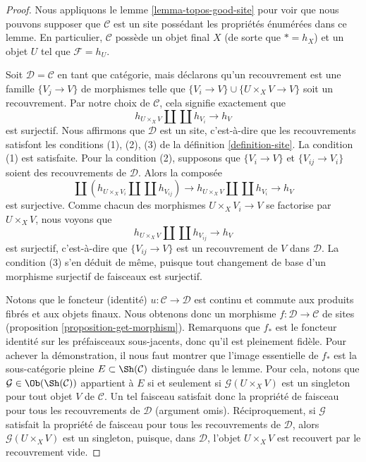 \begin{proof}
Nous appliquons le lemme \ref{lemma-topos-good-site} pour voir que nous pouvons supposer
que $\mathcal{C}$ est un site possédant les propriétés énumérées dans ce lemme.
En particulier, $\mathcal{C}$ possède un objet final $X$ (de sorte que
$* = h_X$) et un objet $U$ tel que $\mathcal{F} = h_U$.

\medskip\noindent
Soit $\mathcal{D} = \mathcal{C}$ en tant que catégorie, mais déclarons qu'un recouvrement
est une famille $\{V_j \to V\}$ de morphismes telle que
$\{V_i \to V\} \cup \{U \times_X V \to V\}$ soit un recouvrement.
Par notre choix de $\mathcal{C}$, cela signifie exactement que
$$
h_{U \times_X V} \amalg \coprod h_{V_i} \longrightarrow h_V
$$
est surjectif. Nous affirmons que $\mathcal{D}$ est un site, c'est-à-dire que les recouvrements
satisfont les conditions (1), (2), (3) de la définition \ref{definition-site}.
La condition (1) est satisfaite. Pour la condition (2), supposons que
$\{V_i \to V\}$ et $\{V_{ij} \to V_i\}$ soient des recouvrements de $\mathcal{D}$.
Alors la composée
$$
\coprod \left(
h_{U \times_X V_i} \amalg \coprod h_{V_{ij}}
\right) \longrightarrow
h_{U \times_X V} \amalg \coprod h_{V_i} \longrightarrow h_V
$$
est surjective. Comme chacun des morphismes $U \times_X V_i \to V$
se factorise par $U \times_X V$, nous voyons que
$$
h_{U \times_X V} \amalg \coprod h_{V_{ij}} \longrightarrow h_V
$$
est surjectif, c'est-à-dire que $\{V_{ij} \to V\}$ est un recouvrement de $V$ dans
$\mathcal{D}$. La condition (3) s'en déduit de même, puisque tout changement de base
d'un morphisme surjectif de faisceaux est surjectif.

\medskip\noindent
Notons que le foncteur (identité) $u : \mathcal{C} \to \mathcal{D}$ est
continu et commute aux produits fibrés et aux objets finaux. Nous obtenons donc
un morphisme $f : \mathcal{D} \to \mathcal{C}$ de sites
(proposition \ref{proposition-get-morphism}).
Remarquons que $f_*$ est le foncteur identité sur les
préfaisceaux sous-jacents, donc qu'il est pleinement fidèle. Pour achever la démonstration, il nous faut
montrer que l'image essentielle de $f_*$ est la sous-catégorie pleine
$E \subset \Sh(\mathcal{C})$ distinguée dans le lemme. Pour cela, notons
que $\mathcal{G} \in \Ob(\Sh(\mathcal{C}))$ appartient à $E$ si et seulement si
$\mathcal{G}(U \times_X V)$ est un singleton pour tout objet
$V$ de $\mathcal{C}$. Un tel faisceau satisfait donc la
propriété de faisceau pour tous les recouvrements de $\mathcal{D}$ (argument omis).
Réciproquement, si $\mathcal{G}$ satisfait la propriété de faisceau
pour tous les recouvrements de $\mathcal{D}$, alors $\mathcal{G}(U \times_X V)$
est un singleton, puisque, dans $\mathcal{D}$, l'objet $U \times_X V$ est
recouvert par le recouvrement vide.
\end{proof}

